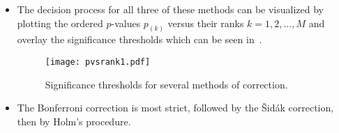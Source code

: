 \begin{itemize}
      \item The decision process for all three of these methods can be visualized by plotting the ordered $p$-values
            $ p_{(k)} $ versus their ranks $ k=1,2,\ldots,M $ and overlay the significance thresholds which can
            be seen in~.
            \begin{figure}[!htbp]
                  \centering
                  \texttt{[image: pvsrank1.pdf]}
                  \caption{Significance thresholds for several methods of correction.}\label{fig:pvsrank1}
            \end{figure}
      \item The Bonferroni correction is most strict, followed by the Šidák correction, then by Holm's procedure.
\end{itemize}
